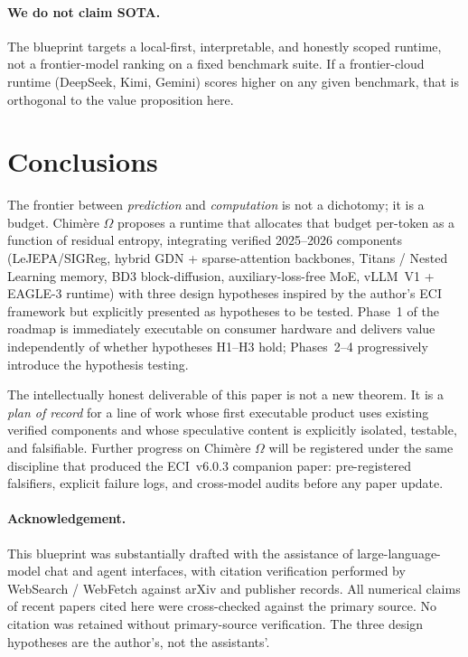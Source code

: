 \documentclass[10pt,a4paper]{article}
\theoremstyle{remark}
\begin{document}
\paragraph{We do not claim SOTA.}
The blueprint targets a local-first, interpretable, and honestly
scoped runtime, not a frontier-model ranking on a fixed benchmark
suite. If a frontier-cloud runtime (DeepSeek, Kimi, Gemini) scores
higher on any given benchmark, that is orthogonal to the value
proposition here.

\section{Conclusions}
\label{sec:conclusions}

The frontier between \emph{prediction} and \emph{computation} is
not a dichotomy; it is a budget. Chim\`ere $\Omega$ proposes a
runtime that allocates that budget per-token as a function of
residual entropy, integrating verified 2025--2026 components
(LeJEPA/SIGReg, hybrid GDN + sparse-attention backbones,
Titans / Nested Learning memory, BD3 block-diffusion,
auxiliary-loss-free MoE, vLLM~V1 + EAGLE-3 runtime) with three
design hypotheses inspired by the author's ECI framework but
explicitly presented as hypotheses to be tested. Phase~1 of the
roadmap is immediately executable on consumer hardware and
delivers value independently of whether hypotheses H1--H3 hold;
Phases~2--4 progressively introduce the hypothesis testing.

The intellectually honest deliverable of this paper is not a new
theorem. It is a \emph{plan of record} for a line of work whose
first executable product uses existing verified components and
whose speculative content is explicitly isolated, testable, and
falsifiable. Further progress on Chim\`ere $\Omega$ will be
registered under the same discipline that produced the ECI~v6.0.3
companion paper: pre-registered falsifiers, explicit failure logs,
and cross-model audits before any paper update.

\paragraph{Acknowledgement.}
This blueprint was substantially drafted with the assistance of
large-language-model chat and agent interfaces, with citation
verification performed by WebSearch / WebFetch against arXiv and
publisher records. All numerical claims of recent papers
cited here were cross-checked against the primary source. No
citation was retained without primary-source verification. The
three design hypotheses are the author's, not the assistants'.
\end{document}
